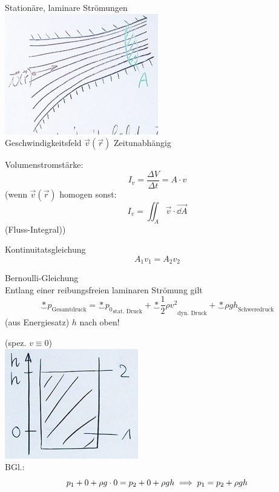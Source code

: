 \begin{rep*}[ note = Strömungen in Flüssigkeiten ]
	Stationäre, laminare Strömungen \\
	\includegraphics{Bild83} \\
	Geschwindigkeitsfeld $\vec{v}(\vec{r})$ Zeitunabhängig
	
	Volumenstromstärke:
	\[ I_v = \frac{\Delta V}{\Delta t} = A \cdot v \]
	(wenn $\vec{v}(\vec{r})$ homogen sonst:
	\[ I_v = \iint_A \vec{v} \cdot \vec{\dd A} \]
	(Fluss-Integral))
	
	Kontinuitatsgleichung \\
	\[ A_1 v_1 = A_2 v_2 \]
	
	Bernoulli-Gleichung \\
	Entlang einer reibungsfreien laminaren Strömung gilt
	\[ \underbrace*{p}_{\text{Gesamtdruck}} = \underbrace*{p_0}_{\text{stat. Druck}} + \underbrace*{\frac{1}{2} \rho v^2}_{\text{dyn. Druck}} + \underbrace*{\rho g h}_{\text{Schweredruck}} \]
	(aus Energiesatz) $h$ nach oben!
\end{rep*}

\begin{bsp*}[ note = Hydrostatik ]
	(spez. $v \equiv 0$) \\
	\includegraphics{Bild84} \\
	BGl.:
	\[
		p_1 + 0 + \rho g \cdot 0 = p_2 + 0 + \rho g h \\
		\implies p_1 = p_2 + \rho g h
	\]
\end{bsp*}

